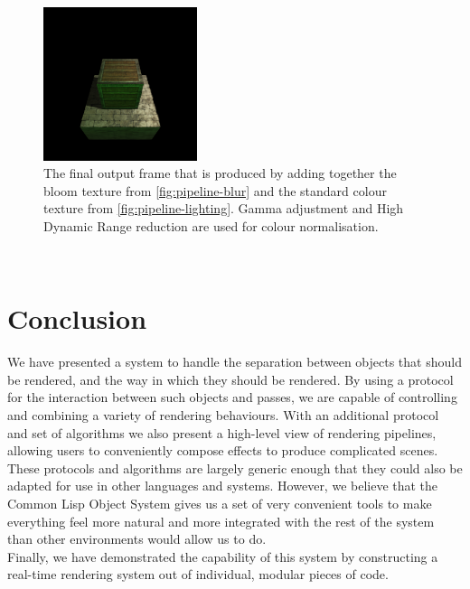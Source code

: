 \documentclass[format=sigconf]{acmart}
\begin{document}
\begin{figure}[h]
  \begin{center}
    \includegraphics[width=0.4\textwidth]{pipeline-frame.png}
  \end{center}
  \caption{The final output frame that is produced by adding together the bloom texture from \autoref{fig:pipeline-blur} and the standard colour texture from \autoref{fig:pipeline-lighting}. Gamma adjustment and High Dynamic Range reduction are used for colour normalisation.}
  \label{fig:pipeline-frame}
\end{figure}

\newpage ~ %

\section{Conclusion}\label{conclusion}
We have presented a system to handle the separation between objects that should be rendered, and the way in which they should be rendered. By using a protocol for the interaction between such objects and passes, we are capable of controlling and combining a variety of rendering behaviours. With an additional protocol and set of algorithms we also present a high-level view of rendering pipelines, allowing users to conveniently compose effects to produce complicated scenes. \\

These protocols and algorithms are largely generic enough that they could also be adapted for use in other languages and systems. However, we believe that the Common Lisp Object System gives us a set of very convenient tools to make everything feel more natural and more integrated with the rest of the system than other environments would allow us to do. \\

Finally, we have demonstrated the capability of this system by constructing a real-time rendering system out of individual, modular pieces of code.
\end{document}
